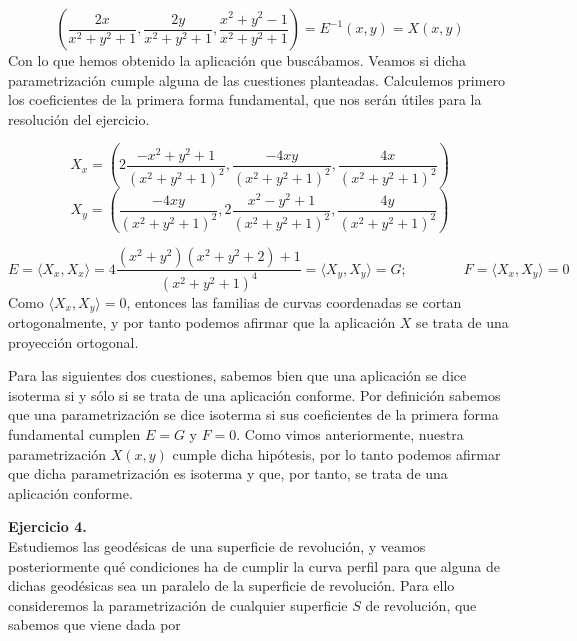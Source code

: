 \documentclass[fleqn]{article}
\begin{document}
    $$\left(\frac{2x}{x^2 + y^2 + 1}, \frac{2y}{x^2 + y^2 + 1}, \frac{x^2 + y^2 - 1}{x^2 + y^2 + 1}\right) = E^{-1}(x,y) = X(x,y) $$
    Con lo que hemos obtenido la aplicación que buscábamos. Veamos si dicha parametrización cumple alguna de las cuestiones planteadas. Calculemos primero los coeficientes
    de la primera forma fundamental, que nos serán útiles para la resolución del ejercicio.
    
    $$X_x = \left( 2\frac{- x^2 + y^2 + 1}{(x^2 + y^2 + 1)^2}, \frac{ - 4xy}{(x^2 + y^2 + 1)^2}, \frac{4x}{(x^2 + y^2 + 1)^2} \right) $$
    $$X_y = \left( \frac{ - 4xy}{(x^2 + y^2 + 1)^2}, 2\frac{x^2 - y^2 + 1}{(x^2 + y^2 + 1)^2}, \frac{4y}{(x^2 + y^2 + 1)^2} \right) $$

    $$E = \langle X_x,X_x \rangle = 4\frac{(x^2 + y^2)(x^2 + y^2 + 2) + 1}{(x^2 + y^2 + 1)^4} = \langle X_y,X_y \rangle = G; \quad \quad \quad \quad
    F = \langle X_x,X_y \rangle = 0
    $$
    Como $\langle X_x,X_y \rangle = 0$, entonces las familias de curvas coordenadas se cortan ortogonalmente, y por tanto podemos afirmar que la aplicación $X$
    se trata de una proyección ortogonal.

    Para las siguientes dos cuestiones, sabemos bien que una aplicación se dice isoterma si y sólo si se trata de una aplicación conforme. Por definición sabemos que una 
    parametrización se dice isoterma si sus coeficientes de la primera forma fundamental cumplen $E=G$ y $F=0$. Como vimos anteriormente, nuestra parametrización $X(x,y)$
    cumple dicha hipótesis, por lo tanto podemos afirmar que dicha parametrización es isoterma y que, por tanto, se trata de una aplicación conforme.

    \newpage























    \textbf{Ejercicio 4. } \\

    Estudiemos las geodésicas de una superficie de revolución, y veamos posteriormente qué condiciones ha de cumplir la curva perfil para que alguna de 
    dichas geodésicas sea un paralelo de la superficie de revolución. Para ello consideremos la parametrización de cualquier superficie $S$ de revolución,
    que sabemos que viene dada por 
    
\end{document}
